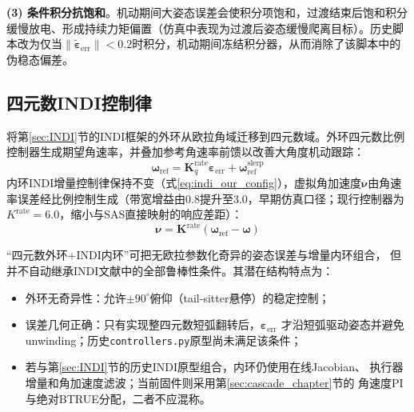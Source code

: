 \textbf{(3) 条件积分抗饱和}。机动期间大姿态误差会使积分项饱和，过渡结束后饱和积分缓慢放电、形成持续力矩偏置（仿真中表现为过渡后姿态缓慢爬离目标）。历史脚本改为仅当$\|\widetilde{\boldsymbol{\varepsilon}}_{\text{err}}\|<0.2$时积分，机动期间冻结积分器，从而消除了该脚本中的伪稳态偏差。

\subsection{四元数INDI控制律}

将第\ref{sec:INDI}节的INDI框架的外环从欧拉角域迁移到四元数域。外环四元数比例控制器生成期望角速率，并叠加参考角速率前馈以改善大角度机动跟踪：
\begin{equation}
    \boldsymbol{\omega}_{\text{ref}} = \mathbf{K}_q^{\text{rate}} \boldsymbol{\varepsilon}_{\text{err}} + \boldsymbol{\omega}_{\text{ref}}^{\text{slerp}}
    \label{eq:indi_outer_quat}
\end{equation}
内环INDI增量控制律保持不变（式\ref{eq:indi_our_config}），虚拟角加速度$\boldsymbol{\nu}$由角速率误差经比例控制生成（带宽增益由$0.8$提升至$3.0$，早期仿真口径；现行控制器为$K^{\text{rate}}=6.0$，缩小与SAS直接映射的响应差距）：
\begin{equation}
    \boldsymbol{\nu} = \mathbf{K}^{\text{rate}}(\boldsymbol{\omega}_{\text{ref}} - \boldsymbol{\omega})
    \label{eq:indi_inner_quat}
\end{equation}

“四元数外环+INDI内环”可把无欧拉参数化奇异的姿态误差与增量内环组合，
但并不自动继承INDI文献中的全部鲁棒性条件。其潜在结构特点为：
\begin{itemize}
    \item 外环无奇异性：允许$\pm90^\circ$俯仰（tail-sitter悬停）的稳定控制；
    \item 误差几何正确：只有实现整四元数短弧翻转后，$\boldsymbol{\varepsilon}_{\text{err}}$
          才沿短弧驱动姿态并避免unwinding；历史\texttt{controllers.py}原型尚未满足该条件；
    \item 若与第\ref{sec:INDI}节的历史INDI原型组合，内环仍使用在线Jacobian、
          执行器增量和角加速度滤波；当前固件则采用第\ref{sec:cascade_chapter}节的
          角速度PI与绝对BTRUE分配，二者不应混称。
\end{itemize}
